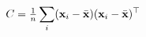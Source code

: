 \documentclass[preview]{standalone}
\begin{document}
\begin{align*}
\special{dvisvgm:raw <g id='unique000'>}C = \tfrac{1}{n}\sum_i (\mathbf{x}_i - \bar{\mathbf{x}})(\mathbf{x}_i - \bar{\mathbf{x}})^{\top}\special{dvisvgm:raw </g>}
\end{align*}
\end{document}
